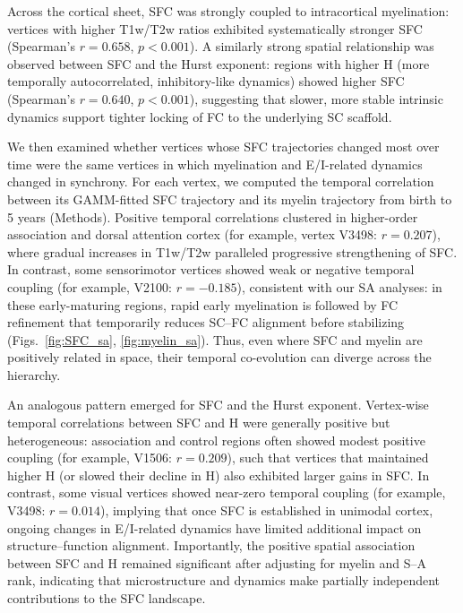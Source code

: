 Across the cortical sheet, SFC was strongly coupled to intracortical myelination: vertices with higher T1w/T2w ratios exhibited systematically stronger SFC (Spearman's $r = 0.658$, $p < 0.001$). A similarly strong spatial relationship was observed between SFC and the Hurst exponent: regions with higher H (more temporally autocorrelated, inhibitory-like dynamics) showed higher SFC (Spearman's $r = 0.640$, $p < 0.001$), suggesting that slower, more stable intrinsic dynamics support tighter locking of FC to the underlying SC scaffold.

We then examined whether vertices whose SFC trajectories changed most over time were the same vertices in which myelination and E/I-related dynamics changed in synchrony. For each vertex, we computed the temporal correlation between its GAMM-fitted SFC trajectory and its myelin trajectory from birth to 5 years (Methods). Positive temporal correlations clustered in higher-order association and dorsal attention cortex (for example, vertex V3498: $r = 0.207$), where gradual increases in T1w/T2w paralleled progressive strengthening of SFC. In contrast, some sensorimotor vertices showed weak or negative temporal coupling (for example, V2100: $r = -0.185$), consistent with our SA analyses: in these early-maturing regions, rapid early myelination is followed by FC refinement that temporarily reduces SC--FC alignment before stabilizing (Figs.~\ref{fig:SFC_sa}, \ref{fig:myelin_sa}). Thus, even where SFC and myelin are positively related in space, their temporal co-evolution can diverge across the hierarchy.

An analogous pattern emerged for SFC and the Hurst exponent. Vertex-wise temporal correlations between SFC and H were generally positive but heterogeneous: association and control regions often showed modest positive coupling (for example, V1506: $r = 0.209$), such that vertices that maintained higher H (or slowed their decline in H) also exhibited larger gains in SFC. In contrast, some visual vertices showed near-zero temporal coupling (for example, V3498: $r = 0.014$), implying that once SFC is established in unimodal cortex, ongoing changes in E/I-related dynamics have limited additional impact on structure--function alignment. Importantly, the positive spatial association between SFC and H remained significant after adjusting for myelin and S--A rank, indicating that microstructure and dynamics make partially independent contributions to the SFC landscape.

